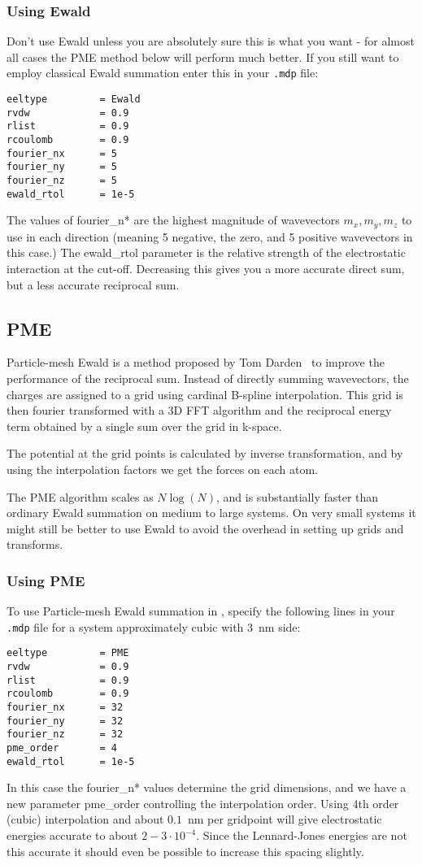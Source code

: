 \subsubsection{Using Ewald}
Don't use Ewald unless you are absolutely sure this is what you want - 
for almost all cases the PME method below will perform much better. 
If you still want to employ classical Ewald summation enter this in
your {\tt .mdp} file:
\begin{verbatim}
eeltype         = Ewald
rvdw            = 0.9
rlist           = 0.9
rcoulomb        = 0.9
fourier_nx      = 5
fourier_ny      = 5
fourier_nz      = 5
ewald_rtol      = 1e-5
\end{verbatim}
The values of fourier\_n* are the highest magnitude of wavevectors
$m_x,m_y,m_z$ to use in each direction (meaning 5 negative, the zero,
and 5 positive wavevectors in this case.)
The ewald\_rtol parameter is the relative
strength of the electrostatic interaction at the cut-off. Decreasing
this gives you a more accurate direct sum, but a less accurate
reciprocal sum. 
 
\subsection{PME}
\label{sec:pme}
Particle-mesh Ewald is a method proposed by Tom
Darden~\cite{Darden93,Essmann95} to improve the performance of the
reciprocal sum. Instead of directly summing wavevectors, the charges
are assigned to a grid using cardinal B-spline interpolation. This
grid is then fourier transformed with a 3D FFT algorithm and 
the reciprocal energy term obtained by a single sum over the grid in k-space.

The potential at the grid points is calculated by inverse
transformation, and by using the interpolation factors we get the
forces on each atom. 

The PME algorithm scales as $N \log(N)$, and is substantially faster
than ordinary Ewald summation on medium to large systems. On very
small systems it might still be better to use Ewald to avoid the
overhead in setting up grids and transforms.

\subsubsection{Using PME}
To use Particle-mesh Ewald summation in {\gromacs}, specify the
following lines in your {\tt .mdp} file for a system approximately
cubic with $3$~nm side:
\begin{verbatim}
eeltype         = PME
rvdw            = 0.9
rlist           = 0.9
rcoulomb        = 0.9
fourier_nx      = 32
fourier_ny      = 32
fourier_nz      = 32
pme_order       = 4
ewald_rtol      = 1e-5
\end{verbatim}
In this case the fourier\_n* values determine the grid dimensions, 
and we have a new parameter pme\_order controlling the interpolation
order. Using 4th order (cubic) interpolation and about $0.1$~nm per
gridpoint 
will give electrostatic energies accurate to about $2-3\cdot10^{-4}$. Since
the Lennard-Jones energies are not this accurate it should even be possible 
to increase this spacing slightly.


